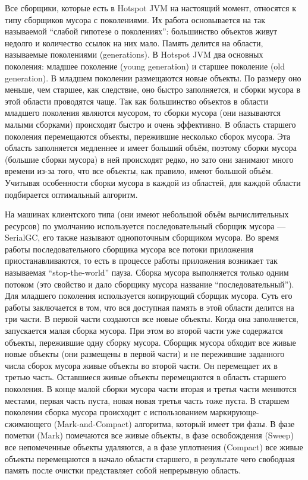 Все сборщики, которые есть в Hotspot JVM на настоящий момент, относятся к типу сборщиков мусора
с поколениями. Их работа основывается на так называемой ``слабой гипотезе о поколениях'':
большинство объектов живут недолго и количество ссылок на них мало. Память делится на области, называемые
поколениями (generations). В Hotspot JVM два основных поколения: младшее поколение (young generation)
и старшее поколение (old generation).
В младшем поколении размещаются новые объекты. По размеру оно меньше, чем 
старшее, как следствие, оно быстро заполняется, и сборки мусора в этой
области проводятся чаще. Так как большинство объектов в области младшего поколения
являются мусором, то сборки мусора
(они называются малыми сборками) происходят быстро и очень эффективно. В область старшего поколения
перемещаются объекты,
пережившие несколько сборок мусора. Эта область заполняется медленнее и имеет больший объём,
поэтому сборки мусора (большие сборки мусора) в ней происходят редко, но зато они занимают
много времени из-за того,
что все объекты, как правило, имеют большой объём. Учитывая особенности сборки мусора 
в каждой из областей, для каждой области подбирается оптимальный алгоритм.

На машинах клиентского типа (они имеют небольшой объём вычислительных ресурсов) по
умолчанию используется последовательный сборщик мусора --- SerialGC, его также 
называют однопоточным сборщиком мусора. Во время работы последовательного сборщика
мусора все потоки приложения приостанавливаются, то есть в процессе работы приложения
возникает так называемая ``stop-the-world'' пауза. Сборка мусора выполняется только 
одним потоком (это свойство и дало сборщику мусора название ``последовательный'').
Для младшего поколения используется копирующий сборщик мусора. Суть его работы заключается
в том, что вся доступная память в этой области делится на три части.
В первой части создаются все новые объекты. Когда она заполняется,
запускается малая сборка мусора.
При этом во второй части уже содержатся объекты, пережившие
одну сборку мусора. Сборщик мусора обходит все живые новые объекты (они размещены в первой части) и не пережившие заданного числа сборок мусора 
живые объекты во второй части. Он перемещает их в третью часть.
Оставшиеся живые объекты перемещаются в область старшего поколения. В конце малой сборки мусора
части вторая и третья части меняются местами, первая часть пуста, новая 
новая третья часть тоже пуста. В старшем поколении сборка мусора происходит с использованием 
маркирующе-сжимающего
(Mark-and-Compact) алгоритма, который имеет три фазы. В фазе пометки (Mark) помечаются
все живые объекты, в фазе освобождения (Sweep) все непомеченные объекты удаляются, 
а в фазе уплотнения (Compact) все живые объекты перемещаются в начало области старшего, 
в результате чего свободная память после очистки представляет собой непрерывную область. 

